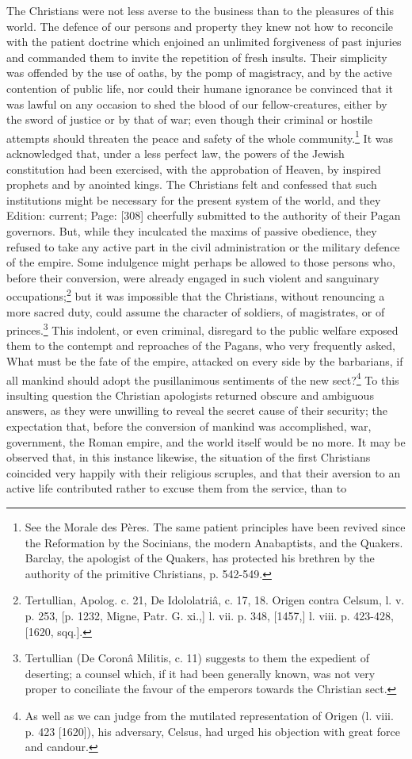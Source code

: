 The Christians were not less averse to the business than to the pleasures of this world. The defence of our persons and property they knew not how to reconcile with the patient doctrine which enjoined an unlimited forgiveness of past injuries and commanded them to invite the repetition of fresh insults. Their simplicity was offended by the use of oaths, by the pomp of magistracy, and by the active contention of public life, nor could their humane ignorance be convinced that it was lawful on any occasion to shed the blood of our fellow-creatures, either by the sword of justice or by that of war; even though their criminal or hostile attempts should threaten the peace and safety of the whole community.\footnote{See the Morale des Pères. The same patient principles have been revived since the Reformation by the Socinians, the modern Anabaptists, and the Quakers. Barclay, the apologist of the Quakers, has protected his brethren by the authority of the primitive Christians, p. 542-549.} It was acknowledged that, under a less perfect law, the powers of the Jewish constitution had been exercised, with the approbation of Heaven, by inspired prophets and by anointed kings. The Christians felt and confessed that such institutions might be necessary for the present system of the world, and they Edition: current; Page: [308] cheerfully submitted to the authority of their Pagan governors. But, while they inculcated the maxims of passive obedience, they refused to take any active part in the civil administration or the military defence of the empire. Some indulgence might perhaps be allowed to those persons who, before their conversion, were already engaged in such violent and sanguinary occupations;\footnote{Tertullian, Apolog. c. 21, De Idololatriâ, c. 17, 18. Origen contra Celsum, l. v. p. 253, [p. 1232, Migne, Patr. G. xi.,] l. vii. p. 348, [1457,] l. viii. p. 423-428, [1620, sqq.].} but it was impossible that the Christians, without renouncing a more sacred duty, could assume the character of soldiers, of magistrates, or of princes.\footnote{Tertullian (De Coronâ Militis, c. 11) suggests to them the expedient of deserting; a counsel which, if it had been generally known, was not very proper to conciliate the favour of the emperors towards the Christian sect.} This indolent, or even criminal, disregard to the public welfare exposed them to the contempt and reproaches of the Pagans, who very frequently asked, What must be the fate of the empire, attacked on every side by the barbarians, if all mankind should adopt the pusillanimous sentiments of the new sect?\footnote{As well as we can judge from the mutilated representation of Origen (l. viii. p. 423 [1620]), his adversary, Celsus, had urged his objection with great force and candour.} To this insulting question the Christian apologists returned obscure and ambiguous answers, as they were unwilling to reveal the secret cause of their security; the expectation that, before the conversion of mankind was accomplished, war, government, the Roman empire, and the world itself would be no more. It may be observed that, in this instance likewise, the situation of the first Christians coincided very happily with their religious scruples, and that their aversion to an active life contributed rather to excuse them from the service, than to 